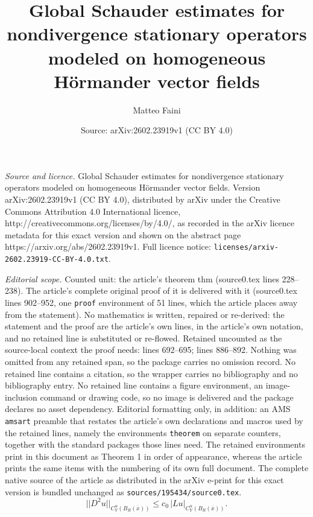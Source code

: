 \documentclass[10pt,a4paper]{amsart}
\title{Global Schauder estimates for nondivergence stationary operators modeled on homogeneous Hörmander vector fields}
\author{Matteo Faini}
\date{Source: arXiv:2602.23919v1 (CC BY 4.0)}
\begin{document}
\maketitle

\noindent\emph{Source and licence.} Global Schauder estimates for nondivergence stationary operators modeled on homogeneous Hörmander vector fields. Version arXiv:2602.23919v1 (CC BY 4.0), distributed by arXiv under the Creative Commons Attribution 4.0 International licence, http://creativecommons.org/licenses/by/4.0/, as recorded in the arXiv licence metadata for this exact version and shown on the abstract page https://arxiv.org/abs/2602.23919v1. Full licence notice: \texttt{licenses/arxiv-2602.23919-CC-BY-4.0.txt}.\par\smallskip

\noindent\textit{Editorial scope.} Counted unit: the article's theorem thm (source0.tex lines 228--238). The article's complete original proof of it is delivered with it (source0.tex lines 902--952, one \texttt{proof} environment of 51 lines, which the article places away from the statement). No mathematics is written, repaired or re-derived: the statement and the proof are the article's own lines, in the article's own notation, and no retained line is substituted or re-flowed.  Retained uncounted as the source-local context the proof needs: lines 692--695; lines 886--892.  Nothing was omitted from any retained span, so the package carries no omission record.  No retained line contains a citation, so the wrapper carries no bibliography and no bibliography entry.  No retained line contains a figure environment, an image-inclusion command or drawing code, so no image is delivered and the package declares no asset dependency.  Editorial formatting only, in addition: an AMS \texttt{amsart} preamble that restates the article's own declarations and macros used by the retained lines, namely the environments \texttt{theorem} on separate counters, together with the standard packages those lines need.  The retained environments print in this document as Theorem 1 in order of appearance, whereas the article prints the same items with the numbering of its own full document.  The complete native source of the article as distributed in the arXiv e-print for this exact version is bundled unchanged as \texttt{sources/195434/source0.tex}.
    \begin{equation}
    \label{||Y_h Y_l u|| <= C ||Lu||}
        ||D^2 u||_{C^{\alpha}_Y(B_R(\overline{x}))} \leq c_0 \, |Lu|_{C^{\alpha}_Y(B_R(\overline{x}))}.
    \end{equation}
\end{document}
